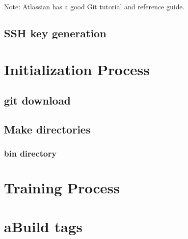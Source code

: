 \documentclass{article}
\begin{document}
Note: Atlassian has a good Git tutorial and reference guide. 

\subsection{SSH key generation}

\section{Initialization Process}
\subsection{git download}
\subsection{Make directories}
\subsubsection{bin directory}
\section{Training Process}                      

\section{aBuild tags} %
\end{document}

